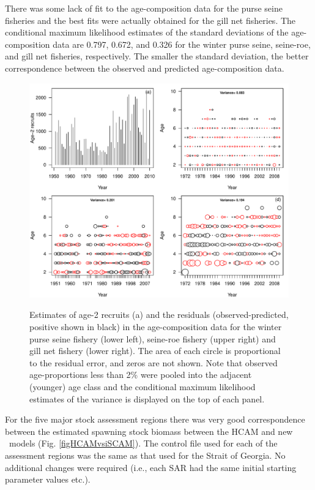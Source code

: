 There was some lack of fit to the age-composition data for the purse seine fisheries and the best fits were actually obtained for the gill net fisheries. The conditional maximum likelihood estimates of the standard deviations of the age-composition data are 0.797, 0.672, and 0.326 for the winter purse seine, seine-roe, and gill net fisheries, respectively.  The smaller the standard deviation, the better correspondence between the observed and predicted age-composition data.

\begin{figure}[!tbp]
	\includegraphics[width=\textwidth]{../Figs/fig3_HCAM_ctrl.pdf}\\
	\caption{Estimates of age-2 recruits (a) and the residuals (observed-predicted, positive shown in black)  in the age-composition data for the winter purse seine fishery (lower left), seine-roe fishery (upper right) and gill net fishery (lower right). The area of each circle is proportional to the residual error, and zeros are not shown. Note that observed age-proportions less than 2\% were pooled into the adjacent (younger) age class and the conditional maximum likelihood estimates of the variance is displayed on the top of each panel.}\label{fig3_HCAM_ctrl}
\end{figure}

For the five major stock assessment regions there was very good correspondence between the estimated spawning stock biomass between the HCAM and new \iscam\  models (Fig. \ref{figHCAMvsiSCAM}). The control file used for each of the assessment regions was the same as that used for the Strait of Georgia.  No additional changes were required (i.e., each SAR had the same initial starting parameter values etc.).

